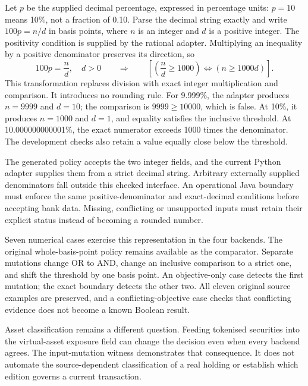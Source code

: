 Let $p$ be the supplied decimal percentage, expressed in percentage units:
$p=10$ means 10\%, not a fraction of 0.10. Parse the decimal string exactly and
write $100p=n/d$ in basis points, where $n$ is an integer and $d$ is a positive
integer. The positivity condition is supplied by the rational adapter. Multiplying
an inequality by a positive denominator preserves its direction, so
\begin{equation}
  100p=\frac{n}{d},\quad d>0
  \qquad\Longrightarrow\qquad
  \left[\left(\frac{n}{d}\geq 1000\right)
  \Longleftrightarrow
  \left(n\geq 1000d\right)\right].
  \label{eq:exact-fractional-exposure}
\end{equation}
This transformation replaces division with exact integer multiplication and
comparison. It introduces no rounding rule. For 9.999\%, the adapter produces
$n=9999$ and $d=10$; the comparison is $9999\geq10000$, which is false. At 10\%,
it produces $n=1000$ and $d=1$, and equality satisfies the inclusive threshold.
At 10.000000000001\%, the exact numerator exceeds 1000 times the denominator.
The development checks also retain a value equally close below the threshold.

The generated policy accepts the two integer fields, and the current Python
adapter supplies them from a strict decimal string. Arbitrary externally
supplied denominators fall outside this checked interface. An operational Java
boundary must enforce the same positive-denominator and exact-decimal conditions
before accepting bank data. Missing, conflicting or unsupported inputs must
retain their explicit status instead of becoming a rounded number.

Seven numerical cases exercise this representation in the four backends. The
original whole-basis-point policy remains available as the comparator. Separate
mutations change OR to AND, change an inclusive comparison to a strict one, and
shift the threshold by one basis point. An objective-only case detects the first
mutation; the exact boundary detects the other two. All eleven original source
examples are preserved, and a conflicting-objective case checks that conflicting
evidence does not become a known Boolean result.

Asset classification remains a different question. Feeding tokenised securities
into the virtual-asset exposure field can change the decision even when every
backend agrees. The input-mutation witness demonstrates that consequence. It
does not automate the source-dependent classification of a real holding or
establish which edition governs a current transaction.

